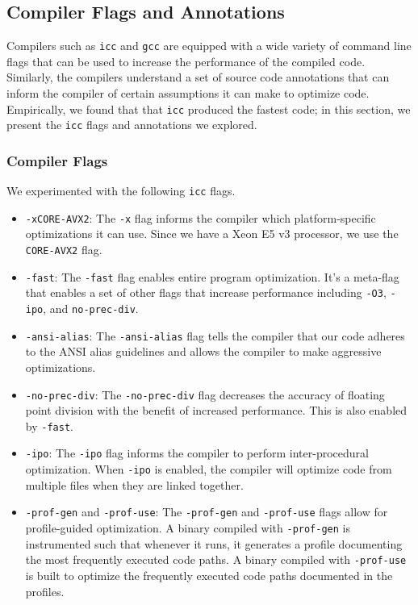 \newcommand{\ttt}[1]{\texttt{#1}}
\newcommand{\icc}{\texttt{icc}}
\newcommand{\gcc}{\texttt{gcc}}

\subsection{Compiler Flags and Annotations}
Compilers such as \icc{} and \gcc{} are equipped with a wide variety of command
line flags that can be used to increase the performance of the compiled code.
Similarly, the compilers understand a set of source code annotations that can
inform the compiler of certain assumptions it can make to optimize code.
Empirically, we found that that \icc{} produced the fastest code; in this
section, we present the \icc{} flags and annotations we explored.

\subsubsection{Compiler Flags}
We experimented with the following \icc{} flags.

\begin{itemize}
  \item \ttt{-xCORE-AVX2}:
    The \ttt{-x} flag informs the compiler which platform-specific
    optimizations it can use. Since we have a Xeon E5 v3 processor, we use the
    \ttt{CORE-AVX2} flag.

  \item \ttt{-fast}:
    The \ttt{-fast} flag enables entire program optimization. It's a meta-flag
    that enables a set of other flags that increase performance including
    \ttt{-O3}, \ttt{-ipo}, and \ttt{no-prec-div}.

  \item \ttt{-ansi-alias}:
    The \ttt{-ansi-alias} flag tells the compiler that our code adheres to the
    ANSI alias guidelines and allows the compiler to make aggressive
    optimizations.

  \item \ttt{-no-prec-div}:
    The \ttt{-no-prec-div} flag decreases the accuracy of floating point
    division with the benefit of increased performance. This is also enabled by
    \ttt{-fast}.

  \item \ttt{-ipo}:
    The \ttt{-ipo} flag informs the compiler to perform inter-procedural
    optimization. When \ttt{-ipo} is enabled, the compiler will optimize code
    from multiple files when they are linked together.

  \item \ttt{-prof-gen} and \ttt{-prof-use}:
    The \ttt{-prof-gen} and \ttt{-prof-use} flags allow for profile-guided
    optimization. A binary compiled with \ttt{-prof-gen} is instrumented such
    that whenever it runs, it generates a profile documenting the most
    frequently executed code paths. A binary compiled with \ttt{-prof-use} is
    built to optimize the frequently executed code paths documented in the
    profiles.
\end{itemize}

